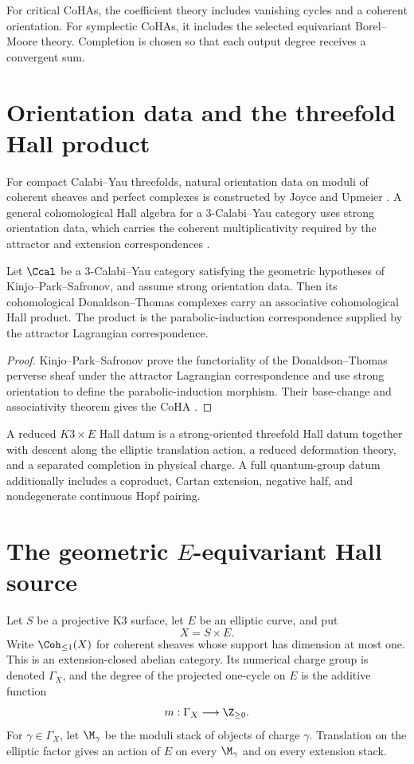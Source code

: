 For critical CoHAs, the coefficient theory includes vanishing cycles and a coherent orientation. For symplectic CoHAs, it includes the selected equivariant Borel--Moore theory. Completion is chosen so that each output degree receives a convergent sum.

\chapter{Orientation data and the threefold Hall product}
For compact Calabi--Yau threefolds, natural orientation data on moduli of coherent sheaves and perfect complexes is constructed by Joyce and Upmeier \cite{JoyceUpmeier}.  A general cohomological Hall algebra for a $3$-Calabi--Yau category uses strong orientation data, which carries the coherent multiplicativity required by the attractor and extension correspondences \cite{KPS}.

\begin{theorem}
Let $\Ccal$ be a $3$-Calabi--Yau category satisfying the geometric hypotheses of Kinjo--Park--Safronov, and assume strong orientation data.  Then its cohomological Donaldson--Thomas complexes carry an associative cohomological Hall product.  The product is the parabolic-induction correspondence supplied by the attractor Lagrangian correspondence.
\end{theorem}
\begin{proof}
Kinjo--Park--Safronov prove the functoriality of the Donaldson--Thomas perverse sheaf under the attractor Lagrangian correspondence and use strong orientation to define the parabolic-induction morphism.  Their base-change and associativity theorem gives the CoHA \cite{KPS}.
\end{proof}

\begin{definition}
A reduced $K3\times E$ Hall datum is a strong-oriented threefold Hall datum together with descent along the elliptic translation action, a reduced deformation theory, and a separated completion in physical charge.  A full quantum-group datum additionally includes a coproduct, Cartan extension, negative half, and nondegenerate continuous Hopf pairing.
\end{definition}

\chapter{The geometric \texorpdfstring{$E$}{E}-equivariant Hall source}
Let $S$ be a projective K3 surface, let $E$ be an elliptic curve, and put
\[
 X=S\times E.
\]
Write $\Coh_{\leq1}(X)$ for coherent sheaves whose support has dimension at most one.  This is an extension-closed abelian category.  Its numerical charge group is denoted $\Gamma_X$, and the degree of the projected one-cycle on $E$ is the additive function
\[
 m:\Gamma_X\longrightarrow\Z_{\geq0}.
\]
For $\gamma\in\Gamma_X$, let $\M_\gamma$ be the moduli stack of objects of charge $\gamma$.  Translation on the elliptic factor gives an action of $E$ on every $\M_\gamma$ and on every extension stack.

